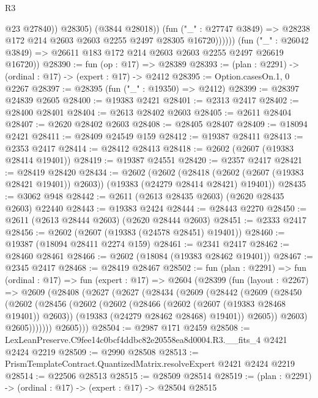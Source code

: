 \begin{lexlean}{R3}
\begin{coremodule}
                        @23
                        @27840))
                    @28305)
                  (@3844 @28018))
                (fun ("_" : @27747 @3849) =>
                @28238 @172 @214 @2603 @2603 @2255 @2497 @28305 @16720))))))
      (fun ("_" : @26042 @3849) => @26611 @183 @172 @214 @2603 @2603 @2255 @2497 @26619 @16720))
@28390 := fun (op : @17) => @28389
@28393 := (plan : @2291) -> (ordinal : @17) -> (expert : @17) -> @2412
@28395 := Option.casesOn.{1, 0} @2267
@28397 := @28395 (fun ("_" : @19350) => @2412)
@28399 := @28397 @24839 @2605
@28400 := @19383 @2421
@28401 := @2313 @2417
@28402 := @28400 @28401
@28404 := @2613 @28402 @2603
@28405 := @2611 @28404
@28407 := @2620 @28402 @2603
@28408 := @28405 @28407
@28409 := @18094 @2421
@28411 := @28409 @24549 @159
@28412 := @19387 @28411
@28413 := @2353 @2417
@28414 := @28412 @28413
@28418 := @2602 (@2607 (@19383 @28414 @19401))
@28419 := @19387 @24551
@28420 := @2357 @2417
@28421 := @28419 @28420
@28434 := @2602
    (@2602
      (@28418 (@2602 (@2607 (@19383 @28421 @19401)) @2603))
      (@19383 (@24279 @28414 @28421) @19401))
@28435 := @3062 @948
@28442 := @2611 (@2613 @28435 @2603) (@2620 @28435 @2603) @22440
@28443 := @19383 @2424
@28444 := @28443 @2270
@28450 := @2611 (@2613 @28444 @2603) (@2620 @28444 @2603)
@28451 := @2333 @2417
@28456 := @2602 (@2607 (@19383 (@24578 @28451) @19401))
@28460 := @19387 (@18094 @28411 @2274 @159)
@28461 := @2341 @2417
@28462 := @28460 @28461
@28466 := @2602 (@18084 (@19383 @28462 @19401))
@28467 := @2345 @2417
@28468 := @28419 @28467
@28502 := fun (plan : @2291) =>
  fun (ordinal : @17) =>
  fun (expert : @17) =>
  @2604
    (@28399
      (fun (layout : @2267) =>
      @2609
        (@28408
          (@2627
            (@2627
              (@28434
                (@2609
                  (@28442
                    (@2609
                      (@28450
                        (@2602
                          (@28456
                            (@2602
                              (@2602
                                (@28466 (@2602 (@2607 (@19383 @28468 @19401)) @2603))
                                (@19383 (@24279 @28462 @28468) @19401))
                              @2605))
                          @2603)
                        @2605)))))))
          @2605)))
@28504 := @2987 @171 @2459
@28508 := LexLeanPreserve.C9fee14c0bcf4ddbc82e20558ea8d0004.R3.__fits_4 @2421 @2424 @2219
@28509 := @2990 @28508
@28513 := PrismTemplateContract.QuantizedMatrix.resolveExpert @2421 @2424 @2219
@28514 := @22506 @28513
@28515 := @28509 @28514
@28519 := (plan : @2291) -> (ordinal : @17) -> (expert : @17) -> @28504 @28515

\end{coremodule}
\end{lexlean}
